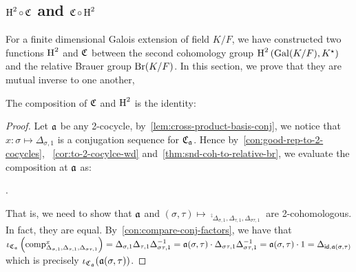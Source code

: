 \subsection{$\operatorname{H}^{2} \circ \operatorname{\mathfrak{C}}$ and $\operatorname{\mathfrak{C}} \circ \operatorname{H}^{2}$}

For a finite dimensional Galois extension of field $K/F$, we have constructed two functions $\operatorname{H}^{2}$ and $\operatorname{\mathfrak{C}}$ between the second cohomology group $\operatorname{H}^{2}\left(\operatorname{Gal}(K/F), K^{\star}\right)$ and the relative Brauer group $\operatorname{Br}(K/F)$. In this section, we prove that they are mutual inverse to one another,

\begin{lemma}\label{lem:relative-br-snd-inverse-1}
  The composition of $\operatorname{\mathfrak{C}}$ and $\operatorname{H}^{2}$ is the identity:
  \begin{center}
  \end{center}
  \leanok
\end{lemma}
\begin{proof}
  Let $\mathfrak{a}$ be any 2-cocycle, by~\cref{lem:cross-product-basis-conj}, we notice that $x : \sigma \mapsto \Delta_{\sigma, 1}$ is a conjugation sequence for $\operatorname{\mathfrak{C}}_{\mathfrak{a}}$. Hence by~\cref{con:good-rep-to-2-cocycles}, ~\cref{cor:to-2-cocylce-wd} and~\cref{thm:snd-coh-to-relative-br}, we evaluate the composition at $\mathfrak{a}$ as:
  \begin{center}
    .
  \end{center}
  That is, we need to show that $\mathfrak{a}$ and $(\sigma, \tau) \mapsto \comp_{\Delta_{\sigma, 1}, \Delta_{\tau, 1}, \Delta_{\sigma\tau, 1}}$ are 2-cohomologous. In fact, they are equal.
  By~\cref{con:compare-conj-factors}, we have that $\iota_{\operatorname{\mathfrak{C}}_{\mathfrak{a}}}\left(\operatorname{comp}^{x}_{\Delta_{\sigma, 1}, \Delta_{\tau, 1}, \Delta_{\sigma\tau, 1}}\right) = \Delta_{\sigma, 1}\Delta_{\tau, 1}\Delta_{\sigma\tau, 1}^{-1} = \mathfrak{a}(\sigma,\tau)\cdot \Delta_{\sigma\tau, 1}\Delta_{\sigma\tau, 1}^{-1} = \mathfrak{a}(\sigma,\tau)\cdot 1 = \Delta_{\mathsf{id},\mathfrak{a}(\sigma,\tau)}$ which is precisely $\iota_{\operatorname{\mathfrak{C}}_{\mathfrak{a}}}(\mathfrak{a}(\sigma,\tau))$.
\end{proof}

